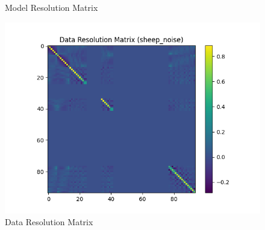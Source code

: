 \documentclass{article}
\begin{document}
\begin{itemize}
\begin{figure}[h]
        \caption{Model Resolution Matrix}
    \end{figure}
    \begin{figure}[h]
        \centering
        \includegraphics[width=1\textwidth]{images/outputs/datares/sheep_noise.png}
        \caption{Data Resolution Matrix}
    \end{figure}
    \clearpage



\end{itemize}
\end{document}
